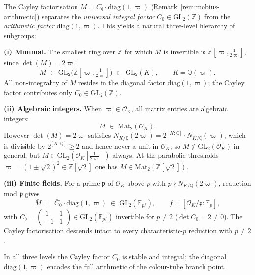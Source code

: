 \begin{remark}
\label{rem:mobius-subgroups}
The Cayley factorisation $M = C_0\cdot\mathrm{diag}(1,\varpi)$
(Remark~\ref{rem:mobius-arithmetic}) separates the
\emph{universal integral factor} $C_0\in\mathrm{GL}_2(\mathbb{Z})$
from the \emph{arithmetic factor} $\mathrm{diag}(1,\varpi)$.
This yields a natural three-level hierarchy of subgroups:

\medskip
\noindent\textbf{(i) Minimal.}\;
The smallest ring over $\mathbb{Z}$ for which $M$ is invertible is
$\mathbb{Z}[\varpi,\tfrac{1}{2\varpi}]$, since $\det(M)=2\varpi$:
\begin{equation}\label{eq:subgroup-minimal}
  M \;\in\; \mathrm{GL}_2\!\bigl(\mathbb{Z}[\varpi,\tfrac{1}{2\varpi}]\bigr)
  \;\subset\; \mathrm{GL}_2(K), \qquad K = \mathbb{Q}(\varpi).
\end{equation}
All non-integrality of $M$ resides in the diagonal factor
$\mathrm{diag}(1,\varpi)$; the Cayley factor contributes only
$C_0\in\mathrm{GL}_2(\mathbb{Z})$.

\medskip
\noindent\textbf{(ii) Algebraic integers.}\;
When $\varpi\in\mathcal{O}_K$, all matrix entries are algebraic integers:
\begin{equation}\label{eq:subgroup-alg}
  M \;\in\; \mathrm{Mat}_2(\mathcal{O}_K).
\end{equation}
However $\det(M)=2\varpi$ satisfies
$N_{K/\mathbb{Q}}(2\varpi) = 2^{[K:\mathbb{Q}]}\cdot N_{K/\mathbb{Q}}(\varpi)$,
which is divisible by $2^{[K:\mathbb{Q}]}\ge 2$ and hence never a unit
in $\mathcal{O}_K$; so $M\notin\mathrm{GL}_2(\mathcal{O}_K)$ in general,
but $M\in\mathrm{GL}_2(\mathcal{O}_K[\tfrac{1}{2\varpi}])$ always.
At the parabolic thresholds $\varpi=(1\pm\sqrt{2})^2\in\mathbb{Z}[\sqrt{2}]$
one has $M\in\mathrm{Mat}_2(\mathbb{Z}[\sqrt{2}])$.

\medskip
\noindent\textbf{(iii) Finite fields.}\;
For a prime $\mathfrak{p}$ of $\mathcal{O}_K$ above $p$ with
$p\nmid N_{K/\mathbb{Q}}(2\varpi)$, reduction mod $\mathfrak{p}$ gives
\begin{equation}\label{eq:subgroup-finite}
  \bar{M} \;=\;
  \bar{C}_0\cdot\mathrm{diag}(1,\bar{\varpi})
  \;\in\; \mathrm{GL}_2(\mathbb{F}_{p^f}),
  \qquad
  f = [\mathcal{O}_K/\mathfrak{p}:\mathbb{F}_p],
\end{equation}
with $\bar{C}_0=\begin{pmatrix}1&1\\-1&1\end{pmatrix}\in\mathrm{GL}_2(\mathbb{F}_{p^f})$
invertible for $p\ne 2$ ($\det\bar{C}_0 = 2 \ne 0$).
The Cayley factorisation descends intact to every characteristic-$p$
reduction with $p\ne 2$.

\medskip
\noindent
In all three levels the Cayley factor $C_0$ is stable and integral;
the diagonal $\mathrm{diag}(1,\varpi)$ encodes the full arithmetic of
the colour-tube branch point.
\end{remark}

